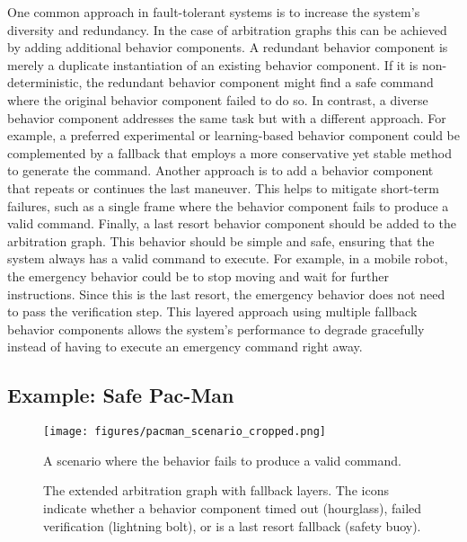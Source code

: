 One common approach in fault-tolerant systems is to increase the system's diversity and redundancy.
In the case of arbitration graphs this can be achieved by adding additional behavior components.
A redundant behavior component is merely a duplicate instantiation of an existing behavior component.
If it is non-deterministic, the redundant behavior component might find a safe command where the original behavior component failed to do so.
In contrast, a diverse behavior component addresses the same task but with a different approach.
For example, a preferred experimental or learning-based behavior component could be complemented by a fallback that employs a more conservative yet stable method to generate the command.
% 
Another approach is to add a behavior component that repeats or continues the last maneuver.
This helps to mitigate short-term failures, such as a single frame where the behavior component fails to produce a valid command.
%
Finally, a last resort behavior component should be added to the arbitration graph.
This behavior should be simple and safe, ensuring that the system always has a valid command to execute.
For example, in a mobile robot, the emergency behavior could be to stop moving and wait for further instructions.
Since this is the last resort, the emergency behavior does not need to pass the verification step.
%
This layered approach using multiple fallback behavior components allows the system's performance to degrade gracefully instead of having to execute an emergency command right away.

\subsection{Example: Safe Pac-Man}

\begin{figure}
    \centering
    \texttt{[image: figures/pacman\_scenario\_cropped.png]}
    \caption{A scenario where the  behavior fails to produce a valid command.}
    \label{fig:pacman-scenario}
\end{figure}

\begin{figure}
    \centering
    
    \caption{The extended arbitration graph with fallback layers. The icons indicate whether a behavior component
        timed out (hourglass),
        failed verification (lightning bolt),
        or is a last resort fallback (safety buoy).}
    \label{fig:pacman-arbitrator-safe}
\end{figure}

